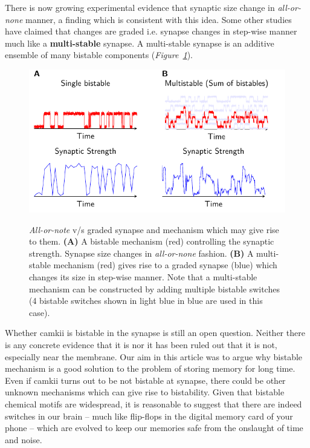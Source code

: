 \documentclass[]{resonance}
\newcommand\Fig[1]{\textit{Figure~\ref{#1}}}
\begin{document}
There is now growing experimental evidence that synaptic size change in
\textit{all-or-none} manner, a finding which is consistent with this idea. Some
other studies have claimed that changes are graded i.e. synapse changes in
step-wise manner much like a \textbf{multi-stable} synapse. A multi-stable
synapse is an additive ensemble of many bistable components
(\Fig{fig:fig_bistable_multistable}).

\begin{figure}[ht!]
    \centering
    \caption{\textit{All-or-note} v/s graded synapse and mechanism which may
        give rise to them. \textbf{(A)} A bistable mechanism (red) controlling the 
        synaptic strength.  Synapse size changes in \textit{all-or-none}
        fashion. \textbf{(B)} A multi-stable mechanism (red) gives rise to a graded synapse (blue) 
        which changes its size in step-wise manner. Note that a multi-stable
        mechanism can be constructed by adding multiple bistable switches (4
        bistable switches shown in light blue in blue are used in this case).
    }
    \includegraphics[width=\linewidth]{./bistable_multistabe_synapse.pdf}
    \label{fig:fig_bistable_multistable}
\end{figure}

Whether \gls{camkii} is bistable in the synapse is still an open question.
Neither there is any concrete evidence that it is nor it has been ruled out that
it is not, especially near the membrane. Our aim in this article was to argue
why bistable mechanism is a good solution to the problem of storing memory for
long time. Even if \gls{camkii} turns out to be not bistable at synapse, there
could be other unknown mechanisms which can give rise to bistability. Given that
bistable chemical motifs are widespread, it is reasonable to suggest that there
are indeed switches in our brain -- much like flip-flops in the digital memory
card of your phone -- which are evolved to keep our memories safe from the
onslaught of time and noise.
\end{document}
